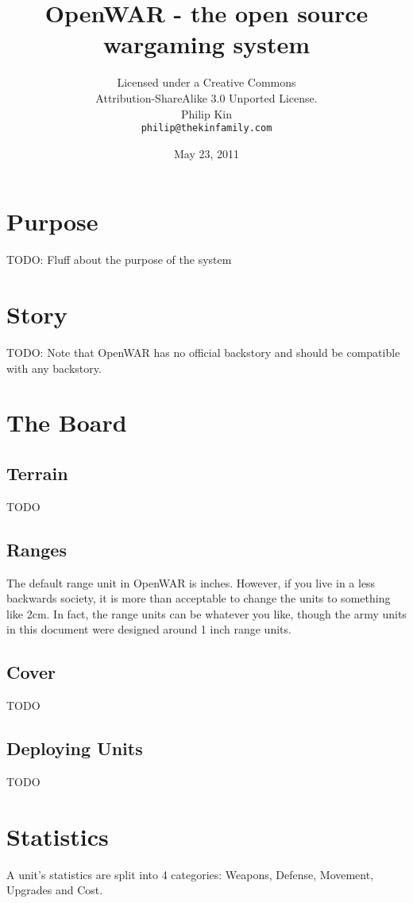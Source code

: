 \documentclass{article}
\begin{document}
\title{OpenWAR - the open source wargaming system}
\author{{\small Licensed under a Creative Commons}\\
  {\small Attribution-ShareAlike 3.0 Unported License.}\\
  Philip Kin\\
  \texttt{philip@thekinfamily.com}}
\date{May 23, 2011}
\maketitle
\tableofcontents

\newpage

\section{Purpose}
TODO: Fluff about the purpose of the system

\section{Story}
TODO: Note that OpenWAR has no official backstory and should be compatible with any backstory.

\section{The Board}
\subsection{Terrain}
TODO
\subsection{Ranges}
The default range unit in OpenWAR is inches.  However, if you live in a less backwards society, it is more than acceptable to change the units to something like 2cm. In fact, the range units can be whatever you like, though the army units in this document were designed around 1 inch range units.
\subsection{Cover}
TODO
\subsection{Deploying Units}
TODO
\section{Statistics}
A unit's statistics are split into 4 categories: Weapons, Defense, Movement, Upgrades and Cost.
\end{document}
